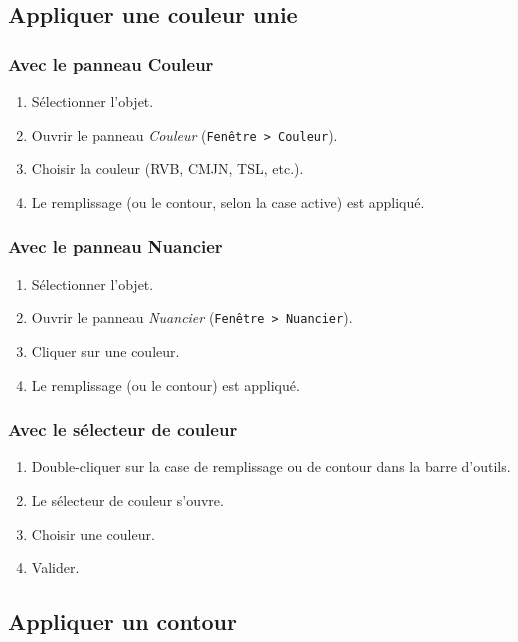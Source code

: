 \subsection{Appliquer une couleur unie}

\subsubsection{Avec le panneau Couleur}

\begin{enumerate}
    \item Sélectionner l'objet.
    \item Ouvrir le panneau \emph{Couleur} (\texttt{Fenêtre > Couleur}).
    \item Choisir la couleur (RVB, CMJN, TSL, etc.).
    \item Le remplissage (ou le contour, selon la case active) est appliqué.
\end{enumerate}

\subsubsection{Avec le panneau Nuancier}

\begin{enumerate}
    \item Sélectionner l'objet.
    \item Ouvrir le panneau \emph{Nuancier} (\texttt{Fenêtre > Nuancier}).
    \item Cliquer sur une couleur.
    \item Le remplissage (ou le contour) est appliqué.
\end{enumerate}

\subsubsection{Avec le sélecteur de couleur}

\begin{enumerate}
    \item Double-cliquer sur la case de remplissage ou de contour dans la barre d'outils.
    \item Le sélecteur de couleur s'ouvre.
    \item Choisir une couleur.
    \item Valider.
\end{enumerate}

\subsection{Appliquer un contour}

